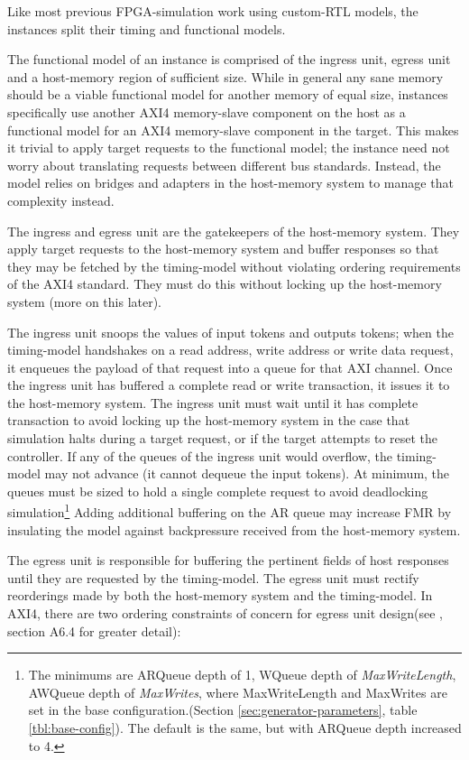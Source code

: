 Like most previous FPGA-simulation work using custom-RTL models, the instances
split their timing and functional models.

The functional model of an instance is comprised of the ingress unit, egress
unit and a host-memory region of sufficient size. While in general any sane
memory should be a viable functional model for another memory of equal size,
instances specifically use another AXI4 memory-slave component on the host as a
functional model for an AXI4 memory-slave component in the target. This makes
it trivial to apply target requests to the functional model; the instance need
not worry about translating requests between different bus standards. Instead,
the model relies on bridges and adapters in the host-memory system to manage
that complexity instead.

The ingress and egress unit are the gatekeepers of the host-memory system. They
apply target requests to the host-memory system and buffer responses so that
they may be fetched by the timing-model without violating ordering requirements
of the AXI4 standard. They must do this without locking up the host-memory
system (more on this later).

The ingress unit snoops the values of input tokens and outputs tokens; when the
timing-model handshakes on a read address, write address or write data request,
it enqueues the payload of that request into a queue for that AXI channel. Once
the ingress unit has buffered a complete read or write transaction, it issues
it to the host-memory system. The ingress unit must wait until it has complete
transaction to avoid locking up the host-memory system in the case that
simulation halts during a target request, or if the target attempts to reset
the controller.  If any of the queues of the ingress unit would overflow, the
timing-model may not advance (it cannot dequeue the input tokens). At minimum,
the queues must be sized to hold a single complete request to avoid deadlocking
simulation\footnote{The minimums are ARQueue depth of 1, WQueue depth of
\emph{MaxWriteLength}, AWQueue depth of \emph{MaxWrites}, where MaxWriteLength
and MaxWrites are set in the base configuration.(Section
\ref{sec:generator-parameters}, table \ref{tbl:base-config}). The default is
the same, but with ARQueue depth increased to 4.} Adding additional buffering
on the AR queue may increase FMR by insulating the model against backpressure
received from the host-memory system.

The egress unit is responsible for buffering the pertinent fields of host
responses until they are requested by the timing-model. The egress unit must
rectify reorderings made by both the host-memory system and the timing-model.
In AXI4, there are two ordering constraints of concern for egress unit
design(see \cite{amba}, section A6.4 for greater detail):


